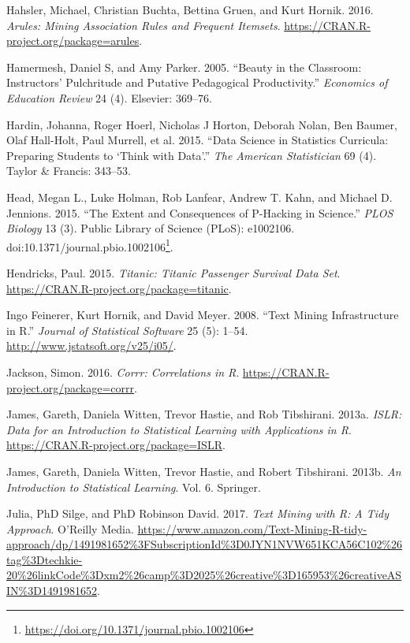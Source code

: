 \documentclass[12pt,]{book}
\renewcommand{\href}[2]{#2\footnote{\url{#1}}}
\begin{document}
\hypertarget{ref-R-arules}{}
Hahsler, Michael, Christian Buchta, Bettina Gruen, and Kurt Hornik.
2016. \emph{Arules: Mining Association Rules and Frequent Itemsets}.
\url{https://CRAN.R-project.org/package=arules}.

\hypertarget{ref-hamermesh2005beauty}{}
Hamermesh, Daniel S, and Amy Parker. 2005. ``Beauty in the Classroom:
Instructors' Pulchritude and Putative Pedagogical Productivity.''
\emph{Economics of Education Review} 24 (4). Elsevier: 369--76.

\hypertarget{ref-hardin2015data}{}
Hardin, Johanna, Roger Hoerl, Nicholas J Horton, Deborah Nolan, Ben
Baumer, Olaf Hall-Holt, Paul Murrell, et al. 2015. ``Data Science in
Statistics Curricula: Preparing Students to `Think with Data'.''
\emph{The American Statistician} 69 (4). Taylor \& Francis: 343--53.

\hypertarget{ref-Head2015}{}
Head, Megan L., Luke Holman, Rob Lanfear, Andrew T. Kahn, and Michael D.
Jennions. 2015. ``The Extent and Consequences of P-Hacking in Science.''
\emph{PLOS Biology} 13 (3). Public Library of Science (PLoS): e1002106.
doi:\href{https://doi.org/10.1371/journal.pbio.1002106}{10.1371/journal.pbio.1002106}.

\hypertarget{ref-R-titanic}{}
Hendricks, Paul. 2015. \emph{Titanic: Titanic Passenger Survival Data
Set}. \url{https://CRAN.R-project.org/package=titanic}.

\hypertarget{ref-tm}{}
Ingo Feinerer, Kurt Hornik, and David Meyer. 2008. ``Text Mining
Infrastructure in R.'' \emph{Journal of Statistical Software} 25 (5):
1--54. \url{http://www.jstatsoft.org/v25/i05/}.

\hypertarget{ref-R-corrr}{}
Jackson, Simon. 2016. \emph{Corrr: Correlations in R}.
\url{https://CRAN.R-project.org/package=corrr}.

\hypertarget{ref-R-ISLR}{}
James, Gareth, Daniela Witten, Trevor Hastie, and Rob Tibshirani. 2013a.
\emph{ISLR: Data for an Introduction to Statistical Learning with
Applications in R}. \url{https://CRAN.R-project.org/package=ISLR}.

\hypertarget{ref-introstatlearning}{}
James, Gareth, Daniela Witten, Trevor Hastie, and Robert Tibshirani.
2013b. \emph{An Introduction to Statistical Learning}. Vol. 6. Springer.

\hypertarget{ref-tidytextminig}{}
Julia, PhD Silge, and PhD Robinson David. 2017. \emph{Text Mining with
R: A Tidy Approach}. O'Reilly Media.
\url{https://www.amazon.com/Text-Mining-R-tidy-approach/dp/1491981652\%3FSubscriptionId\%3D0JYN1NVW651KCA56C102\%26tag\%3Dtechkie-20\%26linkCode\%3Dxm2\%26camp\%3D2025\%26creative\%3D165953\%26creativeASIN\%3D1491981652}.
\end{document}
